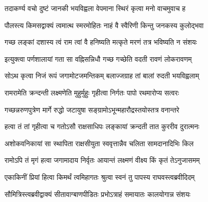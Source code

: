 

\storymeta



\twolineshloka
{तदाकर्ण्य वचो दुष्टं जानकी भयविह्वला}
{वेपमाना स्थिरं कृत्वा मनो वाचमुवाच ह}%

\twolineshloka
{पौलस्त्य किमसद्वाक्यं त्वमात्थ स्मरमोहितः}
{नाहं वै स्वैरिणी किन्तु जनकस्य कुलोद्‌भवा}%

\twolineshloka
{गच्छ लङ्कां दशास्य त्वं राम त्वां वै हनिष्यति}
{मत्कृते मरणं तत्र भविष्यति न संशयः}%

\twolineshloka
{इत्युक्त्वा पर्णशालायां गता सा वह्निसन्निधौ}
{गच्छ गच्छेति वदती रावणं लोकरावणम्}%

\twolineshloka
{सोऽथ कृत्वा निजं रूपं जगामोटजमन्तिकम्}
{बलाज्जग्राह तां बालां रुदती भयविह्वलाम्}%

\twolineshloka
{रामरामेति क्रन्दन्ती लक्ष्मणेति मुहुर्मुहुः}
{गृहीत्वा निर्गतः पापो रथमारोप्य सत्वरः}%

\twolineshloka
{गच्छन्नरुणपुत्रेण मार्गे रुद्धो जटायुषा}
{सङ्ग्रामोऽभून्महारौद्रस्तयोस्तत्र वनान्तरे}%

\twolineshloka
{हत्वा तं तां गृहीत्वा च गतोऽसौ राक्षसाधिपः}
{लङ्कायां क्रन्दती तात कुररीव दुरात्मनः}%

\twolineshloka
{अशोकवनिकायां सा स्थापिता राक्षसीयुता}
{स्ववृत्तान्नैव चलिता सामदानादिभिः किल}%

\twolineshloka
{रामोऽपि तं मृगं हत्वा जगामादाय निर्वृतः}
{आयान्तं लक्ष्मणं वीक्ष्य किं कृतं तेऽनुजासमम्}%

\twolineshloka
{एकाकिनीं प्रियां हित्वा किमर्थं त्वमिहागतः}
{श्रुत्वा स्वनं तु पापस्य राघवस्त्वब्रवीदिदम्}%

\twolineshloka
{सौ‌मित्रिस्त्वब्रवीद्वाक्यं सीतावाग्बाणपीडितः}
{प्रभोऽत्राहं समायातः कालयोगान्न संशयः}%

